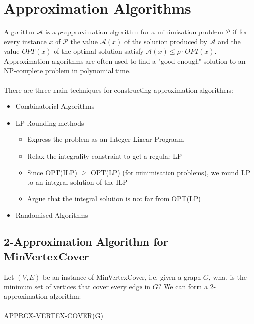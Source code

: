\documentclass{article}
\theoremstyle{plain}
\theoremstyle{definition}
\begin{document}
\section{Approximation Algorithms}
    Algorithm $\mathcal{A}$ is a $\rho$-approximation algorithm for a minimisation problem $\mathcal{P}$ if for every instance $x$ of $\mathcal{P}$ the value $\mathcal{A}(x)$ of the solution produced by $\mathcal{A}$ and the value $OPT(x)$ of the optimal solution satisfy $\mathcal{A}(x) \leq \rho \cdot  OPT(x)$. Approximation algorithms are often used to find a "good enough" solution to an NP-complete problem in polynomial time. \\ \\
    There are three main techniques for constructing approximation algorithms:
    \begin{itemize}
        \item Combinatorial Algorithms
        \item LP Rounding methods
        \begin{itemize}
            \item Express the problem as an Integer Linear Prograam
            \item Relax the integrality constraint to get a regular LP
            \item Since OPT(ILP) $\geq$ OPT(LP) (for minimisation problems), we round LP to an integral solution of the ILP
            \item Argue that the integral solution is not far from OPT(LP)
        \end{itemize}
        \item Randomised Algorithms
    \end{itemize}
    \subsection{2-Approximation Algorithm for MinVertexCover}
    Let $(V, E)$ be an instance of MinVertexCover, i.e. given a graph $G$, what is the minimum set of vertices that cover every edge in $G$? We can form a 2-approximation algorithm:\\ \\
    APPROX-VERTEX-COVER(G)
    \begin{algorithmic}
        \EndWhile
    \end{algorithmic}
    
\end{document}
